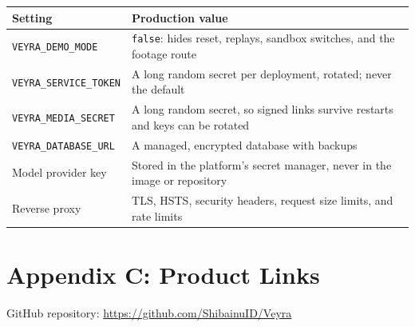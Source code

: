 \documentclass[11pt,letterpaper]{article}
\begin{document}
\begin{table}[H]
\centering
\small
\begin{tabularx}{\textwidth}{>{\raggedright\arraybackslash}p{4.6cm}X}
\toprule
Setting & Production value \\
\midrule
\texttt{VEYRA\_DEMO\_MODE} & \texttt{false}: hides reset, replays, sandbox switches, and the footage route \\
\texttt{VEYRA\_SERVICE\_TOKEN} & A long random secret per deployment, rotated; never the default \\
\texttt{VEYRA\_MEDIA\_SECRET} & A long random secret, so signed links survive restarts and keys can be rotated \\
\texttt{VEYRA\_DATABASE\_URL} & A managed, encrypted database with backups \\
Model provider key & Stored in the platform's secret manager, never in the image or repository \\
Reverse proxy & TLS, HSTS, security headers, request size limits, and rate limits \\
\bottomrule
\end{tabularx}
\end{table}

\section{Appendix C: Product Links}

\noindent GitHub repository: \url{https://github.com/ShibainuID/Veyra}
\end{document}
